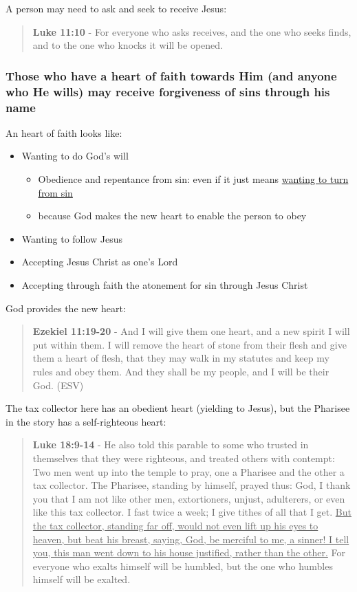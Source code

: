 \documentclass[11pt]{article}
\begin{document}
A person may need to ask and seek to receive Jesus:

\begin{quote}
\textbf{Luke 11:10} - For everyone who asks receives, and the one who seeks finds, and to the one who knocks it will be opened.
\end{quote}

\subsubsection{Those who have a heart of faith towards Him (and anyone who He wills) may receive forgiveness of sins through his name}
\label{sec:orga692fbe}

An heart of faith looks like:
\begin{itemize}
\item Wanting to do God's will
\begin{itemize}
\item Obedience and repentance from sin: even if it just means \uline{wanting to turn from sin}
\item because God makes the new heart to enable the person to obey
\end{itemize}
\item Wanting to follow Jesus
\item Accepting Jesus Christ as one's Lord
\item Accepting through faith the atonement for sin through Jesus Christ
\end{itemize}

God provides the new heart:

\begin{quote}
\textbf{Ezekiel 11:19-20} - And I will give them one heart, and a new spirit I will put within them. I will remove the heart of stone from their flesh and give them a heart of flesh, that they may walk in my statutes and keep my rules and obey them. And they shall be my people, and I will be their God. (ESV)
\end{quote}

The tax collector here has an obedient heart (yielding to Jesus), but the Pharisee in the story has a self-righteous heart:

\begin{quote}
\textbf{Luke 18:9-14} - He also told this parable to some who trusted in themselves that they were righteous, and treated others with contempt: Two men went up into the temple to pray, one a Pharisee and the other a tax collector. The Pharisee, standing by himself, prayed thus: God, I thank you that I am not like other men, extortioners, unjust, adulterers, or even like this tax collector. I fast twice a week; I give tithes of all that I get. \uline{But the tax collector, standing far off, would not even lift up his eyes to heaven, but beat his breast, saying, God, be merciful to me, a sinner! I tell you, this man went down to his house justified, rather than the other.} For everyone who exalts himself will be humbled, but the one who humbles himself will be exalted.
\end{quote}
\end{document}

